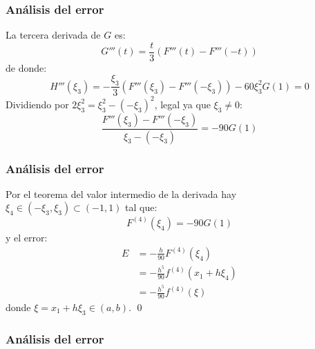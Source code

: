 \documentclass[english, spanish, fleqn,%
hyperref = {colorlinks, urlcolor = blue}%
]{beamer}
\begin{document}
\begin{frame}
  \frametitle{Análisis del error}

  La tercera derivada de \(G\) es:
  \begin{equation*}
    G'''(t)
      = \frac{t}{3} (F'''(t) - F'''(-t))
  \end{equation*}
  de donde:
  \begin{equation*}
    H'''(\xi_3)
      = - \frac{\xi_3}{3} (F'''(\xi_3) - F'''(- \xi_3)) - 60 \xi_3^2 G(1)
      = 0
  \end{equation*}
  Dividiendo por \(2 \xi_3^2 = \xi_3^2 - (- \xi_3)^2\),
  legal ya que \(\xi_3 \ne 0\):
  \begin{equation*}
    \frac{F'''(\xi_3) - F'''(-\xi_3)}{\xi_3 - (- \xi_3)}
      = - 90 G(1)
  \end{equation*}
\end{frame}

\begin{frame}
  \frametitle{Análisis del error}

  Por el teorema del valor intermedio de la derivada
  hay \(\xi_4 \in (-\xi_3, \xi_3) \subset (-1, 1)\) tal que:
  \begin{equation*}
    F^{(4)}(\xi_4)
      = - 90 G(1)
  \end{equation*}
  y el error:
  \begin{align*}
    E
      &= - \frac{h}{90} F^{(4)}(\xi_4) \\
      &= - \frac{h^5}{90} f^{(4)}(x_1 + h \xi_4) \\
      &= - \frac{h^5}{90} f^{(4)}(\xi)
  \end{align*}
  donde \(\xi = x_1 + h \xi_3 \in (a, b)\).
  \qed
\end{frame}

\begin{frame}
  \frametitle{Análisis del error}

\end{frame}
\end{document}
